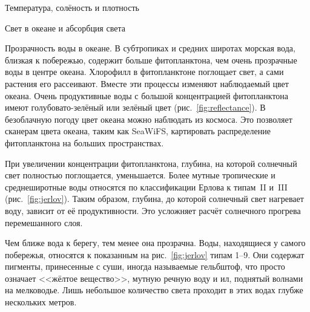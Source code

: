 \begin{chapter}{Температура, солёность и плотность}
\begin{section}{Свет в океане и абсорбция света}
\begin{paragraph}{Прозрачность воды в океане.}
В субтропиках и средних широтах морская вода, близкая к побережью,
содержит больше фитопланктона, чем очень прозрачные воды в центре
океана. Хлорофилл в фитопланктоне поглощает свет, а сами растения его
рассеивают. Вместе эти процессы изменяют наблюдаемый цвет
океана. Очень продуктивные воды с большой концентрацией
фитопланктона имеют голубовато-зелёный или зелёный цвет 
(рис.~\ref{fig:reflectance}).
В безоблачную погоду цвет океана можно наблюдать из
космоса. Это позволяет сканерам цвета океана, таким как SeaWiFS,
картировать распределение фитопланктона на больших пространствах.
%

При увеличении концентрации фитопланктона, глубина, на которой
солнечный свет полностью поглощается, уменьшается. Более мутные
тропические и среднеширотные воды относятся по классификации Ерлова
к типам~II и~III (рис.~\ref{fig:jerlov}). Таким образом, глубина, до которой
солнечный свет нагревает воду, зависит от её продуктивности. Это
усложняет расчёт солнечного прогрева перемешанного слоя.
%

Чем ближе вода к берегу, тем менее она прозрачна. Воды, находящиеся у
самого побережья, относятся к показанным на рис.~\ref{fig:jerlov} типам 1--9.
Они содержат пигменты, принесенные с суши, иногда называемые
гельбштоф, что просто означает <<жёлтое вещество>>, мутную речную воду и
ил, поднятый волнами на мелководье. Лишь небольшое количество света 
проходит в этих водах глубже нескольких метров.
%


\end{paragraph}
\end{section}
\end{chapter}

